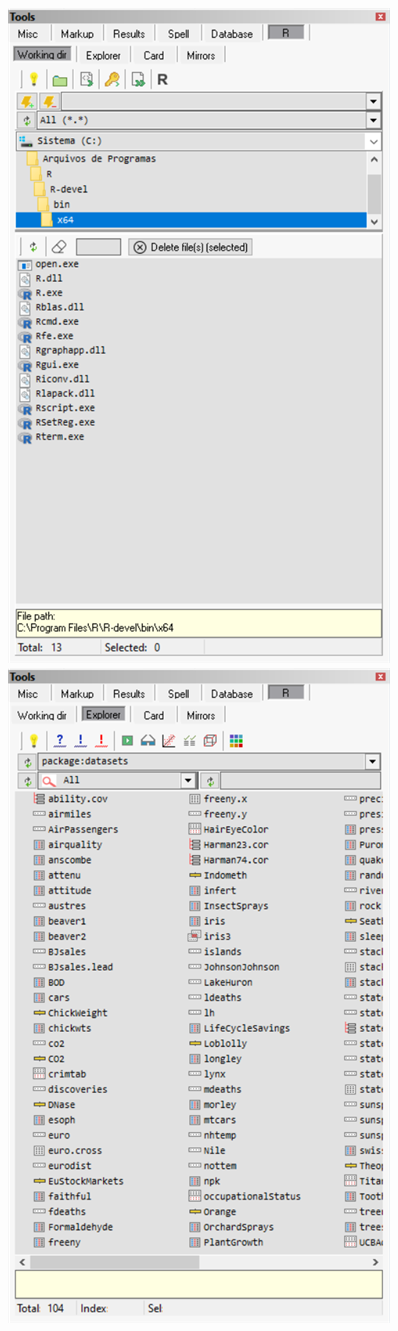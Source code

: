 \begin{figure}[H]
  \includegraphics[scale=0.35]{./res/tools_r_workingdir.png}~~
  \includegraphics[scale=0.35]{./res/tools_r_explorer.png}~~

\end{figure}
